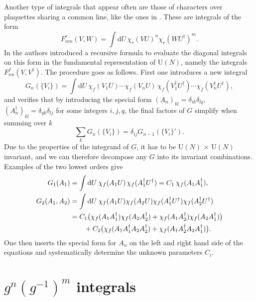 Another type of integrals that appear often are those of characters over
plaquettes sharing a common line, like the ones in
. These are integrals of the form
%
\begin{equation}
  F_{nm}^r(V,W) = \int \mathrm{d} U \, \chi_r(VU)^n \chi_r(WU^{\dagger})^m.
\end{equation}
%
In \citep{Bars:1979xb} the authors introduced a recursive formula to evaluate
the diagonal integrals on this form in the fundamental representation of U$(N)$,
namely the integrals $F_{nn}^f(V,V^{\dagger})$. The procedure goes as follows. First one
introduces a new integral
%
\begin{equation}
  G_n(\{V_i\}) = \int \mathrm{d} U \> \chi_f(V_1 U) \cdots \chi_f(V_n U) \,
    \chi_f(V_1^{\dagger} U^{\dagger}) \cdots \chi_f(V_n^{\dagger} U^{\dagger}),
\end{equation}
%
and verifies that by introducing the special form $(A_n)_{kl} = \delta_{ik}
\delta_{lq}$, $(A_n^{\dagger})_{kl} = \delta_{qk} \delta_{lj}$ for some integers
$i,j,q$, the final factors of $G$ simplify when summing over $k$
%
\begin{equation}
  {\textstyle\sum_k} G_n(\{V_i\}) = \delta_{ij} G_{n-1}(\{V_i\}').
\end{equation}
%
Due to the properties of the integrand of $G$, it has to be U$(N)$ $\times$
U$(N)$ invariant, and we can therefore decompose any $G$ into its invariant
combinations. Examples of the two lowest orders give
%
\begin{align}
  G_1(A_1) &= \int \mathrm{d} U \> \chi_f(A_1 U) \, \chi_f(A_1^{\dagger} U^{\dagger})
   = C_1 \> \chi_f(A_1 A_1^{\dagger}), \\
  G_2(A_1,A_2) &= \int \mathrm{d} U \> \chi_f(A_1 U) \chi_f(A_2 U) 
  \chi_f(A_1^{\dagger} U^{\dagger}) \chi_f(A_2^{\dagger} U^{\dagger})  \nonumber \\
  &= C_1 \big( \chi_f(A_1 A_1^{\dagger}) \chi_f(A_2 A_2^{\dagger}) + \chi_f(A_1
  A_2^{\dagger}) \chi_f(A_2 A_1^{\dagger})\big) \nonumber \\
  &\hskip2em+ C_2 \big(\chi_f(A_1 A_1^{\dagger} A_2 A_2^{\dagger})
  + \chi_f(A_1 A_2^{\dagger} A_2 A_1^{\dagger}) \big).
\end{align}
%
One then inserts the special form for $A_n$ on the left and right hand side of
the equations and systematically determine the unknown parameters $C_i$.

\section{\texorpdfstring{$g^n (g^{-1})^m$}{Un Udm} integrals} \label{sec-sun_integrals}


